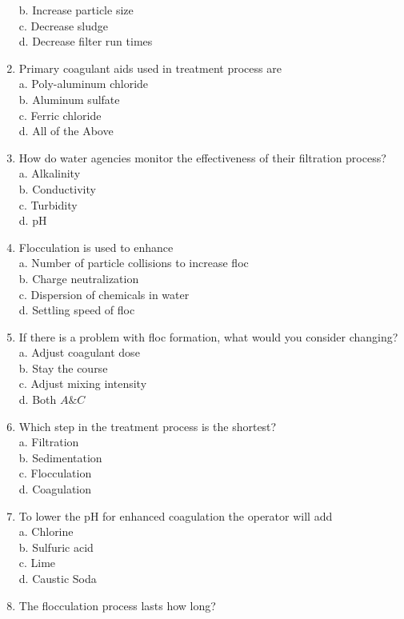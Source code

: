 \begin{enumerate}
b. Increase particle size\\
c. Decrease sludge\\
d. Decrease filter run times\\
\item Primary coagulant aids used in treatment process are\\
a. Poly-aluminum chloride\\
b. Aluminum sulfate\\
c. Ferric chloride\\
d. All of the Above\\
\item How do water agencies monitor the effectiveness of their filtration process?\\
a. Alkalinity\\
b. Conductivity\\
c. Turbidity\\
d. $\mathrm{pH}$\\
\item Flocculation is used to enhance\\
a. Number of particle collisions to increase floc\\
b. Charge neutralization\\
c. Dispersion of chemicals in water\\
d. Settling speed of floc\\
\item If there is a problem with floc formation, what would you consider changing?\\
a. Adjust coagulant dose\\
b. Stay the course\\
c. Adjust mixing intensity\\
d. Both $A \& C$\\
\item Which step in the treatment process is the shortest?\\
a. Filtration\\
b. Sedimentation\\
c. Flocculation\\
d. Coagulation\\
\item To lower the $\mathrm{pH}$ for enhanced coagulation the operator will add\\
a. Chlorine\\
b. Sulfuric acid\\
c. Lime\\
d. Caustic Soda\\
\item The flocculation process lasts how long?\\

\end{enumerate}
